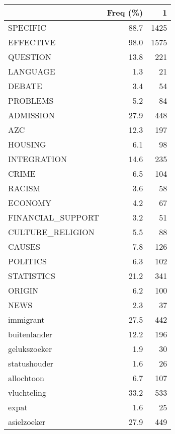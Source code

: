 \begin{tabular}{lrr}
\toprule
{} &  Freq (\%) &     1 \\
\midrule
SPECIFIC          &      88.7 &  1425 \\
EFFECTIVE         &      98.0 &  1575 \\
QUESTION          &      13.8 &   221 \\
LANGUAGE          &       1.3 &    21 \\
DEBATE            &       3.4 &    54 \\
PROBLEMS          &       5.2 &    84 \\
ADMISSION         &      27.9 &   448 \\
AZC               &      12.3 &   197 \\
HOUSING           &       6.1 &    98 \\
INTEGRATION       &      14.6 &   235 \\
CRIME             &       6.5 &   104 \\
RACISM            &       3.6 &    58 \\
ECONOMY           &       4.2 &    67 \\
FINANCIAL\_SUPPORT &       3.2 &    51 \\
CULTURE\_RELIGION  &       5.5 &    88 \\
CAUSES            &       7.8 &   126 \\
POLITICS          &       6.3 &   102 \\
STATISTICS        &      21.2 &   341 \\
ORIGIN            &       6.2 &   100 \\
NEWS              &       2.3 &    37 \\
immigrant         &      27.5 &   442 \\
buitenlander      &      12.2 &   196 \\
gelukszoeker      &       1.9 &    30 \\
statushouder      &       1.6 &    26 \\
allochtoon        &       6.7 &   107 \\
vluchteling       &      33.2 &   533 \\
expat             &       1.6 &    25 \\
asielzoeker       &      27.9 &   449 \\
\bottomrule
\end{tabular}
